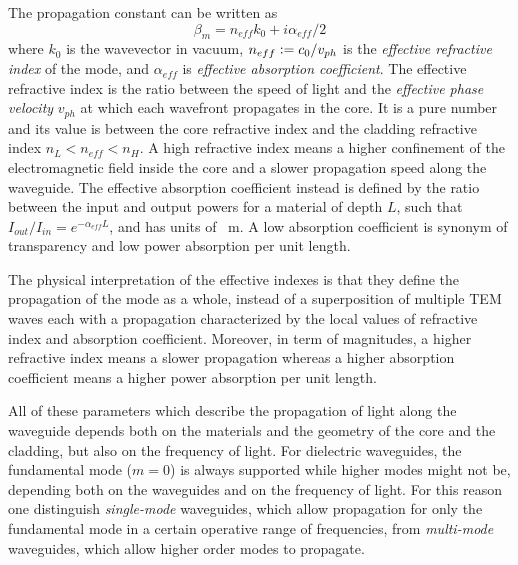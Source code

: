 The propagation constant can be written as
\begin{equation}
\beta_m = n_{eff} k_0 + i \alpha_{eff}/2
\end{equation}
where $k_0$ is the wavevector in vacuum, $n_{eff} \vcentcolon= c_0/v_{ph}$ is the \textit{effective refractive index} of the mode, and $\alpha_{eff}$ is \textit{effective absorption coefficient}.
The effective refractive index is the ratio between the speed of light and the \textit{effective phase velocity} $v_{ph}$ at which each wavefront propagates in the core.
It is a pure number and its value is between the core refractive index and the cladding refractive index $n_L < n_{eff} < n_H$.
A high refractive index means a higher confinement of the electromagnetic field inside the core and a slower propagation speed along the waveguide.
The effective absorption coefficient instead is defined by the ratio between the input and output powers for a material of depth $L$, such that $I_{out}/I_{in}=e^{-\alpha_{eff}L}$, and has units of \si{\per\m}.
A low absorption coefficient is synonym of transparency and low power absorption per unit length.

The physical interpretation of the effective indexes is that they define the propagation of the mode as a whole, instead of a superposition of multiple TEM waves each with a propagation characterized by the local values of refractive index and absorption coefficient.
Moreover, in term of magnitudes, a higher refractive index means a slower propagation whereas a higher absorption coefficient means a higher power absorption per unit length.


All of these parameters which describe the propagation of light along the waveguide depends both on the materials and the geometry of the core and the cladding, but also on the frequency of light.
For dielectric waveguides, the fundamental mode ($m=0$) is always supported while higher modes might not be, depending both on the waveguides and on the frequency of light.
For this reason one distinguish \textit{single-mode} waveguides, which allow propagation for only the fundamental mode in a certain operative range of frequencies, from \textit{multi-mode} waveguides, which allow higher order modes to propagate.

